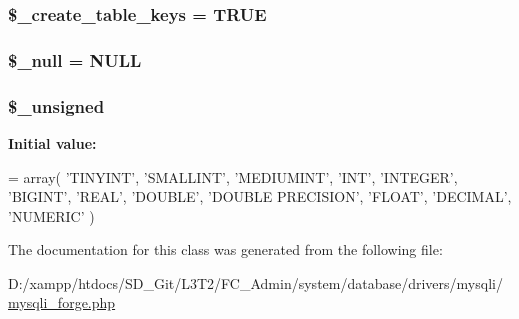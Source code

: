 \subsubsection[{\$\+\_\+create\+\_\+table\+\_\+keys}]{\setlength{\rightskip}{0pt plus 5cm}\$\+\_\+create\+\_\+table\+\_\+keys = T\+R\+U\+E\hspace{0.3cm}{\ttfamily [protected]}}\label{class_c_i___d_b__mysqli__forge_a73e07acdd35c948ad353903c2827af6e}
\hypertarget{class_c_i___d_b__mysqli__forge_ae58fe6a5104d4a069a49b27533ce808f}{}
\subsubsection[{\$\+\_\+null}]{\setlength{\rightskip}{0pt plus 5cm}\$\+\_\+null = \textquotesingle{}N\+U\+L\+L\textquotesingle{}\hspace{0.3cm}{\ttfamily [protected]}}\label{class_c_i___d_b__mysqli__forge_ae58fe6a5104d4a069a49b27533ce808f}
\hypertarget{class_c_i___d_b__mysqli__forge_aae977ae6d61fa183f0b25422b6ddc31c}{}
\subsubsection[{\$\+\_\+unsigned}]{\setlength{\rightskip}{0pt plus 5cm}\$\+\_\+unsigned\hspace{0.3cm}{\ttfamily [protected]}}\label{class_c_i___d_b__mysqli__forge_aae977ae6d61fa183f0b25422b6ddc31c}
{\bfseries Initial value\+:}
\begin{DoxyCode}
= array(
        \textcolor{stringliteral}{'TINYINT'},
        \textcolor{stringliteral}{'SMALLINT'},
        \textcolor{stringliteral}{'MEDIUMINT'},
        \textcolor{stringliteral}{'INT'},
        \textcolor{stringliteral}{'INTEGER'},
        \textcolor{stringliteral}{'BIGINT'},
        \textcolor{stringliteral}{'REAL'},
        \textcolor{stringliteral}{'DOUBLE'},
        \textcolor{stringliteral}{'DOUBLE PRECISION'},
        \textcolor{stringliteral}{'FLOAT'},
        \textcolor{stringliteral}{'DECIMAL'},
        \textcolor{stringliteral}{'NUMERIC'}
    )
\end{DoxyCode}


The documentation for this class was generated from the following file\+:\begin{DoxyCompactItemize}
\item 
D\+:/xampp/htdocs/\+S\+D\+\_\+\+Git/\+L3\+T2/\+F\+C\+\_\+\+Admin/system/database/drivers/mysqli/\hyperlink{mysqli__forge_8php}{mysqli\+\_\+forge.\+php}\end{DoxyCompactItemize}
